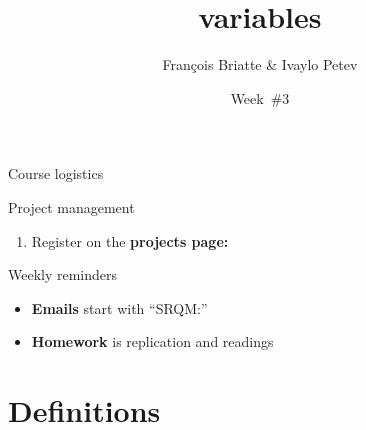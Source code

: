 \documentclass[t]{beamer}
\title{variables}
\author{François Briatte \& Ivaylo Petev}
\date{Week~\#3}
\begin{document}

	\begin{frame}[t]{Course logistics}

    \begin{block}{Project management}
      \begin{enumerate}
        \item Register on the \textbf{projects page:} 
        
      \end{enumerate}
    \end{block}

    \begin{alertblock}{Weekly reminders}
      \begin{itemize}
	       \item \textbf{Emails} start with ``SRQM:''
	       \item \textbf{Homework} is replication and readings
      \end{itemize}
    \end{alertblock}
    		
	\end{frame}

	\section{Definitions}
	
\end{document}
